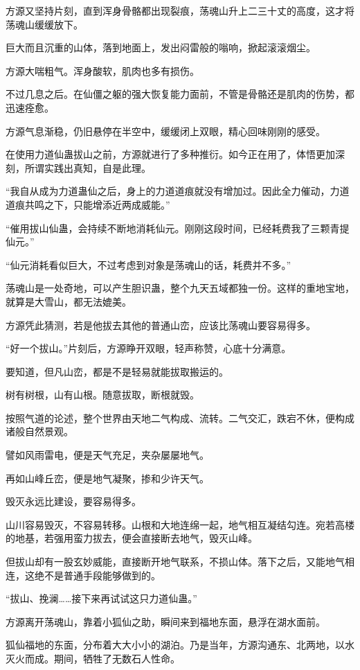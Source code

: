 \begin{this_body}
方源又坚持片刻，直到浑身骨骼都出现裂痕，荡魂山升上二三十丈的高度，这才将荡魂山缓缓放下。

巨大而且沉重的山体，落到地面上，发出闷雷般的嗡响，掀起滚滚烟尘。

方源大喘粗气。浑身酸软，肌肉也多有损伤。

不过几息之后。在仙僵之躯的强大恢复能力面前，不管是骨骼还是肌肉的伤势，都迅速痊愈。

方源气息渐稳，仍旧悬停在半空中，缓缓闭上双眼，精心回味刚刚的感受。

在使用力道仙蛊拔山之前，方源就进行了多种推衍。如今正在用了，体悟更加深刻，所谓实践出真知，自是此理。

“我自从成为力道蛊仙之后，身上的力道道痕就没有增加过。因此全力催动，力道道痕共鸣之下，只能增添近两成威能。”

“催用拔山仙蛊，会持续不断地消耗仙元。刚刚这段时间，已经耗费我了三颗青提仙元。”

“仙元消耗看似巨大，不过考虑到对象是荡魂山的话，耗费并不多。”

荡魂山是一处奇地，可以产生胆识蛊，整个九天五域都独一份。这样的重地宝地，就算是大雪山，都无法媲美。

方源凭此猜测，若是他拔去其他的普通山峦，应该比荡魂山要容易得多。

“好一个拔山。”片刻后，方源睁开双眼，轻声称赞，心底十分满意。

要知道，但凡山峦，都是不是轻易就能拔取搬运的。

树有树根，山有山根。随意拔取，断根就毁。

按照气道的论述，整个世界由天地二气构成、流转。二气交汇，跌宕不休，便构成诸般自然景观。

譬如风雨雷电，便是天气充足，夹杂屡屡地气。

再如山峰丘峦，便是地气凝聚，掺和少许天气。

毁灭永远比建设，要容易得多。

山川容易毁灭，不容易转移。山根和大地连绵一起，地气相互凝结勾连。宛若高楼的地基，若强用蛮力拔去，便会直接断去地气，毁灭山峰。

但拔山却有一股玄妙威能，直接断开地气联系，不损山体。落下之后，又能地气相连，这绝不是普通手段能够做到的。

“拔山、挽澜……接下来再试试这只力道仙蛊。”

方源离开荡魂山，靠着小狐仙之助，瞬间来到福地东面，悬浮在湖水面前。

狐仙福地的东面，分布着大大小小的湖泊。乃是当年，方源沟通东、北两地，以水灭火而成。期间，牺牲了无数石人性命。


\end{this_body}
